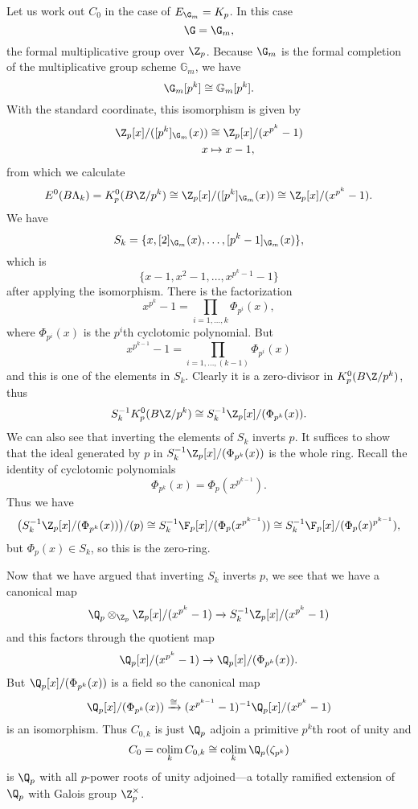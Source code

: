 \begin{example} \label{padicktheory}
Let us work out $C_0$ in the case of $E_{\G_m} = K_p$. In this case 
\[
\G = \G_m,
\]
the formal multiplicative group over $\Z_p$.  Because $\G_m$ is the formal completion of the multiplicative group scheme $\mathbb G_m$, we have
\[
\G_m[p^k] \cong \mathbb{G}_m[p^k].
\]
With the standard coordinate, this isomorphism is given by
\begin{align*}
\Z_p[x]/([p^k]_{\G_m}(x)) & \cong \Z_p[x]/(x^{p^k}-1) \\
x & \mapsto x-1,
\end{align*}
from which we calculate 
\[
E^0(B\Lk) = K_{p}^0(B\Z/p^k) \cong \Z_p[x]/([p^k]_{\G_m}(x)) \cong \Z_p[x]/(x^{p^k}-1).
\]
We have
\[
S_k = \{x,[2]_{\G_m}(x),\ldots, [p^k-1]_{\G_m}(x)\},
\]
which is
\[
\{x-1,x^2-1, \ldots, x^{p^k-1}-1\}
\]
after applying the isomorphism.
There is the factorization
\[
x^{p^k}-1 = \prod_{i=1,\ldots,k}\Phi_{p^i}(x),
\]
where $\Phi_{p^i}(x)$ is the $p^i$th cyclotomic polynomial. But
\[
x^{p^{k-1}}-1 = \prod_{i=1,\ldots,(k-1)}\Phi_{p^i}(x)
\]
and this is one of the elements in $S_k$. Clearly it is a zero-divisor in $K_{p}^0(B\Z/p^k)$, thus
\[
S_{k}^{-1}K_{p}^0(B\Z/p^k) \cong S_{k}^{-1}\Z_p[x]/(\Phi_{p^k}(x)).
\]
We can also see that inverting the elements of $S_{k}$ inverts $p$. It suffices to show that the ideal generated by $p$ in $S_{k}^{-1}\Z_p[x]/(\Phi_{p^k}(x))$ is the whole ring. Recall the identity of cyclotomic polynomials 
\[
\Phi_{p^k}(x) = \Phi_p(x^{p^{k-1}}).
\]
Thus we have
\[
\big ( S_{k}^{-1}\Z_p[x]/(\Phi_{p^k}(x)) \big )/(p) \cong S_{k}^{-1}\F_p[x]/(\Phi_{p}(x^{p^{k-1}})) \cong S_{k}^{-1}\F_p[x]/(\Phi_{p}(x)^{p^{k-1}}),
\]
but $\Phi_{p}(x) \in S_k$, so this is the zero-ring.

Now that we have argued that inverting $S_k$ inverts $p$, we see that we have a canonical map
\[
\Q_p \otimes_{\Z_p} \Z_p[x]/(x^{p^k}-1) \xrightarrow{} S_{k}^{-1}\Z_p[x]/(x^{p^k}-1) 
\]
and this factors through the quotient map
\[
\Q_p[x]/(x^{p^k}-1) \xrightarrow{} \Q_p[x]/(\Phi_{p^k}(x)).
\]
But $\Q_p[x]/(\Phi_{p^k}(x))$ is a field so the canonical map
\[
\Q_p[x]/(\Phi_{p^k}(x)) \xrightarrow{\cong} (x^{p^{k-1}}-1)^{-1}\Q_p[x]/(x^{p^k}-1)
\]
is an isomorphism. Thus $C_{0,k}$ is just $\Q_p$ adjoin a primitive $p^k$th root of unity and
\[
C_0 = \colim_k C_{0,k} \cong \colim_k \Q_p(\zeta_{p^k})
\]
is $\Q_p$ with all $p$-power roots of unity adjoined---a totally ramified extension of $\Q_p$ with Galois group $\Z_{p}^{\times}$.
\end{example}

